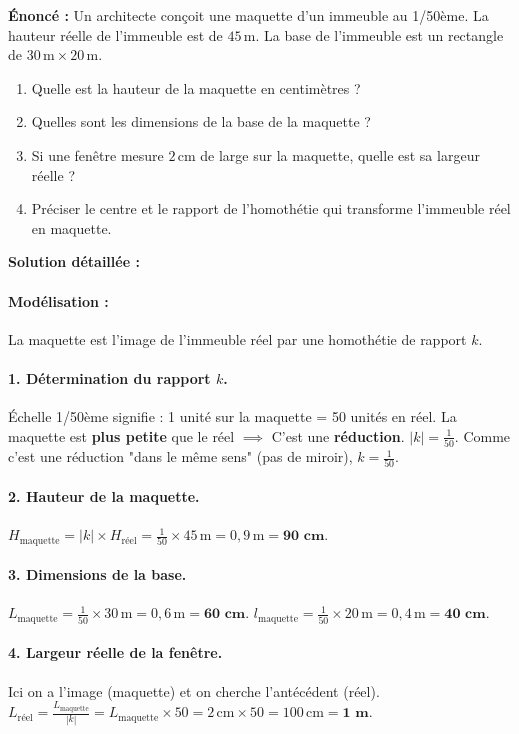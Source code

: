 \documentclass[11pt]{article}
\begin{document}
\begin{exoresolu}
\textbf{Énoncé :} Un architecte conçoit une maquette d'un immeuble au 1/50ème.
La hauteur réelle de l'immeuble est de $45\,\text{m}$. La base de l'immeuble est un rectangle de $30\,\text{m} \times 20\,\text{m}$.
\begin{enumerate}
    \item Quelle est la hauteur de la maquette en centimètres ?
    \item Quelles sont les dimensions de la base de la maquette ?
    \item Si une fenêtre mesure $2\,\text{cm}$ de large sur la maquette, quelle est sa largeur réelle ?
    \item Préciser le centre et le rapport de l'homothétie qui transforme l'immeuble réel en maquette.
\end{enumerate}
\tcblower
\textbf{Solution détaillée :}
\paragraph{Modélisation :} La maquette est l'image de l'immeuble réel par une homothétie de rapport $k$.
\paragraph{1. Détermination du rapport $k$.}
Échelle 1/50ème signifie : 1 unité sur la maquette = 50 unités en réel.
La maquette est \textbf{plus petite} que le réel $\implies$ C'est une \textbf{réduction}.
$|k| = \frac{1}{50}$. Comme c'est une réduction "dans le même sens" (pas de miroir), $k = \frac{1}{50}$.
\paragraph{2. Hauteur de la maquette.}
$H_{\text{maquette}} = |k| \times H_{\text{réel}} = \frac{1}{50} \times 45\,\text{m} = 0,9\,\text{m} = \textbf{90 cm}$.
\paragraph{3. Dimensions de la base.}
$L_{\text{maquette}} = \frac{1}{50} \times 30\,\text{m} = 0,6\,\text{m} = \textbf{60 cm}$.
$l_{\text{maquette}} = \frac{1}{50} \times 20\,\text{m} = 0,4\,\text{m} = \textbf{40 cm}$.
\paragraph{4. Largeur réelle de la fenêtre.}
Ici on a l'image (maquette) et on cherche l'antécédent (réel).
$L_{\text{réel}} = \frac{L_{\text{maquette}}}{|k|} = L_{\text{maquette}} \times 50 = 2\,\text{cm} \times 50 = 100\,\text{cm} = \textbf{1 m}$.

\end{exoresolu}
\end{document}
